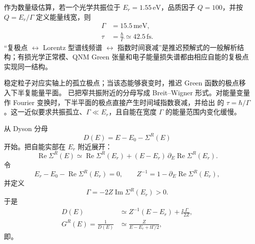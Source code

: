 \begin{exbox}
作为数量级估算，若一个光学共振位于 $E_r=1.55\,\mathrm{eV}$，品质因子 $Q=100$，并按 $Q=E_r/\Gamma$ 定义能量线宽，则
\begin{align*}
 \Gamma&=15.5\,\mathrm{meV},\\
 \tau&=\frac{\hbar}{\Gamma}
 \simeq42.5\,\mathrm{fs}.
\end{align*}
“复极点 $\leftrightarrow$ Lorentz 型谱线频谱 $\leftrightarrow$ 指数时间衰减”是推迟预解式的一般解析结构；有损光学正常模、QNM Green 张量和电子能量损失谱都由相应自能的复极点实现同一结构。


\medskip

稳定粒子对应实轴上的孤立极点；当该态能够衰变时，推迟 Green 函数的极点移入下半复能量平面。 已把窄共振附近的分母写成 Breit--Wigner 形式。对能量变量作 Fourier 变换时，下半平面的极点直接产生时间域指数衰减，并给出 的 $\tau=\hbar/\Gamma$。这一近似要求共振孤立、$\Gamma\ll E_r$，且自能在宽度 $\Gamma$ 的能量范围内变化缓慢。


从 Dyson 分母
\begin{equation*}
 D(E)=E-E_0-\Sigma^R(E)
\end{equation*}
开始。把自能实部在 $E_r$ 附近展开：
\begin{equation*}
 \operatorname{Re}\Sigma^R(E)
 \simeq \operatorname{Re}\Sigma^R(E_r)
 +(E-E_r)\,\partial_E\operatorname{Re}\Sigma^R(E_r).
\end{equation*}
令
\begin{equation*}
 E_r-E_0-\operatorname{Re}\Sigma^R(E_r)=0,
 \qquad
 Z^{-1}=1-\partial_E\operatorname{Re}\Sigma^R(E_r),
\end{equation*}
并定义
\begin{equation*}
 \Gamma=-2Z\operatorname{Im}\Sigma^R(E_r)>0.
\end{equation*}
于是
\begin{align*}
 D(E)
 &\simeq Z^{-1}(E-E_r)+\ii\frac{\Gamma}{2Z},\\
 G^R(E)=\frac1{D(E)}
 &\simeq\frac{Z}{E-E_r+\ii\Gamma/2},
\end{align*}
即。


\end{exbox}
